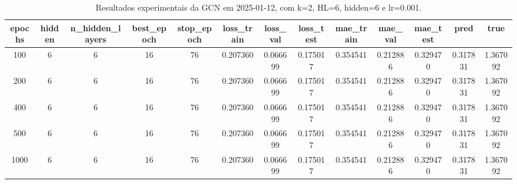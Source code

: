 \begin{table}[h]
\centering
\caption{Resultados experimentais da GCN em 2025-01-12, com k=2, HL=6, hidden=6 e lr=0.001.}
\label{tab:gcn_results_k2_hl6_h6_d20250112}
\begin{tabular}{ccccccccccccc}
\toprule
epochs & hidden & n\_hidden\_layers & best\_epoch & stop\_epoch & loss\_train & loss\_val & loss\_test & mae\_train & mae\_val & mae\_test & pred & true \\
\midrule
100 & 6 & 6 & 16 & 76 & 0.207360 & 0.066699 & 0.175017 & 0.354541 & 0.212886 & 0.329470 & 0.317831 & 1.367092 \\
200 & 6 & 6 & 16 & 76 & 0.207360 & 0.066699 & 0.175017 & 0.354541 & 0.212886 & 0.329470 & 0.317831 & 1.367092 \\
400 & 6 & 6 & 16 & 76 & 0.207360 & 0.066699 & 0.175017 & 0.354541 & 0.212886 & 0.329470 & 0.317831 & 1.367092 \\
500 & 6 & 6 & 16 & 76 & 0.207360 & 0.066699 & 0.175017 & 0.354541 & 0.212886 & 0.329470 & 0.317831 & 1.367092 \\
1000 & 6 & 6 & 16 & 76 & 0.207360 & 0.066699 & 0.175017 & 0.354541 & 0.212886 & 0.329470 & 0.317831 & 1.367092 \\
\bottomrule
\end{tabular}
\end{table}

